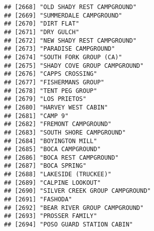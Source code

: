 \documentclass[
]{article}
\begin{document}
\begin{verbatim}
## [2668] "OLD SHADY REST CAMPGROUND"                                                           
## [2669] "SUMMERDALE CAMPGROUND"                                                               
## [2670] "DIRT FLAT"                                                                           
## [2671] "DRY GULCH"                                                                           
## [2672] "NEW SHADY REST CAMPGROUND"                                                           
## [2673] "PARADISE CAMPGROUND"                                                                 
## [2674] "SOUTH FORK GROUP (CA)"                                                               
## [2675] "SHADY COVE GROUP CAMPGROUND"                                                         
## [2676] "CAPPS CROSSING"                                                                      
## [2677] "FISHERMANS GROUP"                                                                    
## [2678] "TENT PEG GROUP"                                                                      
## [2679] "LOS PRIETOS"                                                                         
## [2680] "HARVEY WEST CABIN"                                                                   
## [2681] "CAMP 9"                                                                              
## [2682] "FREMONT CAMPGROUND"                                                                  
## [2683] "SOUTH SHORE CAMPGROUND"                                                              
## [2684] "BOYINGTON MILL"                                                                      
## [2685] "BOCA CAMPGROUND"                                                                     
## [2686] "BOCA REST CAMPGROUND"                                                                
## [2687] "BOCA SPRING"                                                                         
## [2688] "LAKESIDE (TRUCKEE)"                                                                  
## [2689] "CALPINE LOOKOUT"                                                                     
## [2690] "SILVER CREEK GROUP CAMPGROUND"                                                       
## [2691] "FASHODA"                                                                             
## [2692] "BEAR RIVER GROUP CAMPGROUND"                                                         
## [2693] "PROSSER FAMILY"                                                                      
## [2694] "POSO GUARD STATION CABIN"                                                            

\end{verbatim}
\end{document}
